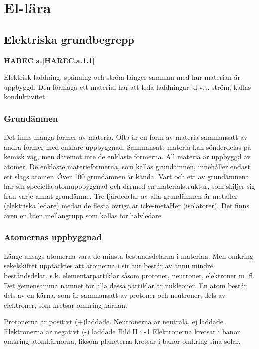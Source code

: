 \chapter{El-lära}

\section{Elektriska grundbegrepp}
\textbf{HAREC a.\ref{HAREC.a.1.1}\label{myHAREC.a.1.1}}

Elektrisk laddning, spänning och ström hänger samman med hur materian är uppbyggd.
Den förmåga ett material har att leda laddningar, d.v.s. ström, kallas konduktivitet.

\subsection{Grundämnen}

Det finns många former av materia. Ofta är en form av materia sammansatt av andra
former med enklare uppbyggnad.
Sammansatt materia kan sönderdelas på kemisk väg, men
däremot inte de enklaste formerna. All materia är uppbyggd av atomer. De enklaste
materieformerna, som kallas grundämnen, innehåller endast ett slags atomer. Över
100 grundämnen är kända.
Vart och ett av grundämnena har sin speciella atomuppbyggnad och därmed en
materialstruktur, som skiljer sig från varje annat grundämne.
Tre fjärdedelar av alla grundämnen är metaller (elektriska ledare) medan de flesta
övriga är icke-metaHer (isolatorer). Det finns även en liten mellangrupp som kallas för
halvledare.

\subsection{Atomernas uppbyggnad}

Länge ansågs atomerna vara de minsta
beståndsdelarna i materian. Men omkring
sekelskiftet upptäcktes att atomerna i sin tur
består av ännu mindre beståndsdelar, s.k.
elementarpartiklar såsom protoner, neutroner, elektroner m .fl. Det gemensamma namnet för alla dessa partiklar är nukleoner.
En atom består dels av en kärna, som är
sammansatt av protoner och neutroner, dels
av elektroner, som kretsar omkring kärnan.

Protonerna är positivt (+)laddade.
Neutronerna är neutrala, ej laddade.
Elektronerna är negativt (-) laddade
Bild II i -1 Elektronerna kretsar i banor
omkring atomkärnorna, liksom planeterna
kretsar i banor omkring sina solar.

